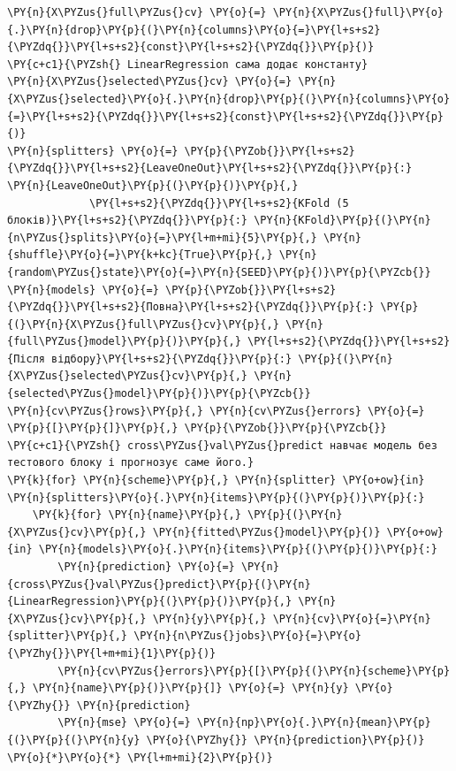 \begin{Verbatim}[commandchars=\\\{\}]
\PY{n}{X\PYZus{}full\PYZus{}cv} \PY{o}{=} \PY{n}{X\PYZus{}full}\PY{o}{.}\PY{n}{drop}\PY{p}{(}\PY{n}{columns}\PY{o}{=}\PY{l+s+s2}{\PYZdq{}}\PY{l+s+s2}{const}\PY{l+s+s2}{\PYZdq{}}\PY{p}{)}        \PY{c+c1}{\PYZsh{} LinearRegression сама додає константу}
\PY{n}{X\PYZus{}selected\PYZus{}cv} \PY{o}{=} \PY{n}{X\PYZus{}selected}\PY{o}{.}\PY{n}{drop}\PY{p}{(}\PY{n}{columns}\PY{o}{=}\PY{l+s+s2}{\PYZdq{}}\PY{l+s+s2}{const}\PY{l+s+s2}{\PYZdq{}}\PY{p}{)}
\PY{n}{splitters} \PY{o}{=} \PY{p}{\PYZob{}}\PY{l+s+s2}{\PYZdq{}}\PY{l+s+s2}{LeaveOneOut}\PY{l+s+s2}{\PYZdq{}}\PY{p}{:} \PY{n}{LeaveOneOut}\PY{p}{(}\PY{p}{)}\PY{p}{,}
             \PY{l+s+s2}{\PYZdq{}}\PY{l+s+s2}{KFold (5 блоків)}\PY{l+s+s2}{\PYZdq{}}\PY{p}{:} \PY{n}{KFold}\PY{p}{(}\PY{n}{n\PYZus{}splits}\PY{o}{=}\PY{l+m+mi}{5}\PY{p}{,} \PY{n}{shuffle}\PY{o}{=}\PY{k+kc}{True}\PY{p}{,} \PY{n}{random\PYZus{}state}\PY{o}{=}\PY{n}{SEED}\PY{p}{)}\PY{p}{\PYZcb{}}
\PY{n}{models} \PY{o}{=} \PY{p}{\PYZob{}}\PY{l+s+s2}{\PYZdq{}}\PY{l+s+s2}{Повна}\PY{l+s+s2}{\PYZdq{}}\PY{p}{:} \PY{p}{(}\PY{n}{X\PYZus{}full\PYZus{}cv}\PY{p}{,} \PY{n}{full\PYZus{}model}\PY{p}{)}\PY{p}{,} \PY{l+s+s2}{\PYZdq{}}\PY{l+s+s2}{Після відбору}\PY{l+s+s2}{\PYZdq{}}\PY{p}{:} \PY{p}{(}\PY{n}{X\PYZus{}selected\PYZus{}cv}\PY{p}{,} \PY{n}{selected\PYZus{}model}\PY{p}{)}\PY{p}{\PYZcb{}}
\PY{n}{cv\PYZus{}rows}\PY{p}{,} \PY{n}{cv\PYZus{}errors} \PY{o}{=} \PY{p}{[}\PY{p}{]}\PY{p}{,} \PY{p}{\PYZob{}}\PY{p}{\PYZcb{}}
\PY{c+c1}{\PYZsh{} cross\PYZus{}val\PYZus{}predict навчає модель без тестового блоку і прогнозує саме його.}
\PY{k}{for} \PY{n}{scheme}\PY{p}{,} \PY{n}{splitter} \PY{o+ow}{in} \PY{n}{splitters}\PY{o}{.}\PY{n}{items}\PY{p}{(}\PY{p}{)}\PY{p}{:}
    \PY{k}{for} \PY{n}{name}\PY{p}{,} \PY{p}{(}\PY{n}{X\PYZus{}cv}\PY{p}{,} \PY{n}{fitted\PYZus{}model}\PY{p}{)} \PY{o+ow}{in} \PY{n}{models}\PY{o}{.}\PY{n}{items}\PY{p}{(}\PY{p}{)}\PY{p}{:}
        \PY{n}{prediction} \PY{o}{=} \PY{n}{cross\PYZus{}val\PYZus{}predict}\PY{p}{(}\PY{n}{LinearRegression}\PY{p}{(}\PY{p}{)}\PY{p}{,} \PY{n}{X\PYZus{}cv}\PY{p}{,} \PY{n}{y}\PY{p}{,} \PY{n}{cv}\PY{o}{=}\PY{n}{splitter}\PY{p}{,} \PY{n}{n\PYZus{}jobs}\PY{o}{=}\PY{o}{\PYZhy{}}\PY{l+m+mi}{1}\PY{p}{)}
        \PY{n}{cv\PYZus{}errors}\PY{p}{[}\PY{p}{(}\PY{n}{scheme}\PY{p}{,} \PY{n}{name}\PY{p}{)}\PY{p}{]} \PY{o}{=} \PY{n}{y} \PY{o}{\PYZhy{}} \PY{n}{prediction}
        \PY{n}{mse} \PY{o}{=} \PY{n}{np}\PY{o}{.}\PY{n}{mean}\PY{p}{(}\PY{p}{(}\PY{n}{y} \PY{o}{\PYZhy{}} \PY{n}{prediction}\PY{p}{)} \PY{o}{*}\PY{o}{*} \PY{l+m+mi}{2}\PY{p}{)}

\end{Verbatim}
